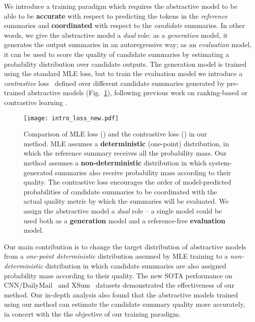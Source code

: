 \documentclass[11pt]{article}
\begin{document}
We introduce a training paradigm which requires the abstractive model to be able to be \textbf{accurate} with respect to predicting the tokens in the \textit{reference} summaries and \textbf{coordinated} with respect to the \textit{candidate} summaries.
In other words, we give the abstractive model a \textit{dual} role: as a \emph{generation} model, it generates the output summaries in an autoregressive way; as an \emph{evaluation} model, it can be used to score the quality of candidate summaries by estimating a probability distribution over candidate outputs.
The generation model is trained using the standard MLE loss, but to train the evaluation model we introduce a \textit{contrastive} loss~\citep{10.1109/CVPR.2006.100} defined over different candidate summaries generated by pre-trained abstractive models (Fig.~\ref{fig:intro}), following previous work on ranking-based or contrastive learning \citep{hopkins-may-2011-tuning, zhong-etal-2020-extractive, liu-etal-2021-refsum}.


\begin{figure}[t!]
    \centering
    \texttt{[image: intro\_loss\_new.pdf]}
    \caption{Comparison of MLE loss () and the contrastive loss () in our method.
    MLE assumes a \textbf{deterministic} (one-point) distribution, in which the reference summary receives all the probability mass.
    Our method assumes a \textbf{non-deterministic} distribution in which system-generated summaries also receive probability mass according to their quality.
    The contrastive loss encourages the order of model-predicted probabilities of candidate summaries to be coordinated with the actual quality metric  by which the summaries will be evaluated.
    We assign the abstractive model a \textit{dual} role -- a single model could be used both as a \textbf{generation} model and a reference-free \textbf{evaluation} model.}
    \label{fig:intro}
\end{figure}


Our main contribution is to change the target distribution of abstractive models from a \textit{one-point deterministic} distribution assumed by MLE training to a \textit{non-deterministic} distribution in which candidate summaries are also assigned probability mass according to their quality.
The new SOTA performance on CNN/DailyMail~\citep{10.5555/2969239.2969428} and XSum~\citep{narayan-etal-2018-dont} datasets demonstrated the effectiveness of our method.
Our in-depth analysis also found that the abstractive models trained using our method can estimate the candidate summary quality more accurately, in concert with the the objective of our training paradigm.
\end{document}
